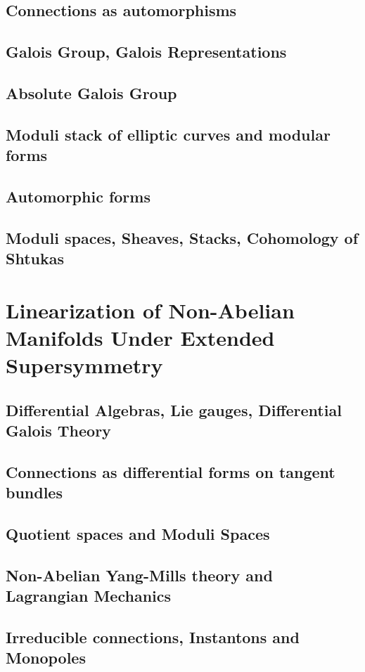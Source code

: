 \documentclass{article}
\theoremstyle{definition}
\begin{document}
    \subsection{Connections as automorphisms}
    \subsection{Galois Group, Galois Representations}
    \subsection{Absolute Galois Group}
    \subsection{Moduli stack of elliptic curves and modular forms}
    \subsection{Automorphic forms}
    \subsection{Moduli spaces, Sheaves, Stacks, Cohomology of Shtukas}
    

\section{Linearization of Non-Abelian Manifolds Under Extended Supersymmetry}
    \subsection{Differential Algebras, Lie gauges, Differential Galois Theory}
    \subsection{Connections as differential forms on tangent bundles}
    \subsection{Quotient spaces and Moduli Spaces}
    \subsection{Non-Abelian Yang-Mills theory and Lagrangian Mechanics}
    \subsection{Irreducible connections, Instantons and Monopoles}
\end{document}
